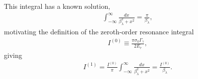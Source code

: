 This integral has a known solution,
\begin{align}
  \int_{-\infty}^\infty  \frac{ dx }{ \beta_\lambda^2 + x^2 } = \frac{\pi}{\beta_\lambda},
\end{align}
motivating the definition of the zeroth-order resonance integral
\begin{align}
  I^{(0)} \equiv \frac{\pi \sigma_0 \Gamma_\gamma}{2E_r},
\end{align}
giving
\begin{align} \label{Eq:thermalizationn_IRResonanceIntegral_first}
  I^{(1)} = \frac{ I^{(0)}}{\pi} \int_{-\infty}^\infty  \frac{ dx }{ \beta_\lambda^2 + x^2 } = \frac{ I^{(0)}}{\beta_\lambda} .
\end{align}
%

